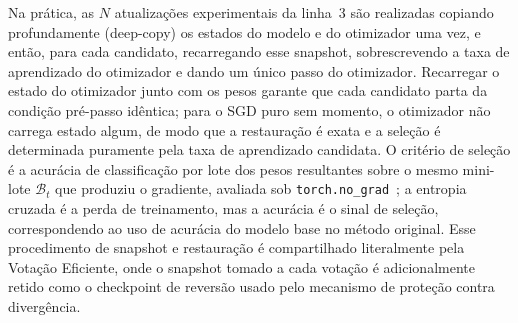 \documentclass[conference]{IEEEtran}
\begin{document}
Na prática, as $N$ atualizações experimentais da linha~3 são realizadas copiando profundamente (deep-copy) os estados do modelo e do otimizador uma vez, e então, para cada candidato, recarregando esse snapshot, sobrescrevendo a taxa de aprendizado do otimizador e dando um único passo do otimizador. Recarregar o estado do otimizador junto com os pesos garante que cada candidato parta da condição pré-passo idêntica; para o SGD puro sem momento, o otimizador não carrega estado algum, de modo que a restauração é exata e a seleção é determinada puramente pela taxa de aprendizado candidata. O critério de seleção é a acurácia de classificação por lote dos pesos resultantes sobre o mesmo mini-lote $\mathcal{B}_t$ que produziu o gradiente, avaliada sob \texttt{torch.no\_grad}~\cite{paszke2019pytorch}; a entropia cruzada é a perda de treinamento, mas a acurácia é o sinal de seleção, correspondendo ao uso de acurácia do modelo base no método original. Esse procedimento de snapshot e restauração é compartilhado literalmente pela Votação Eficiente, onde o snapshot tomado a cada votação é adicionalmente retido como o checkpoint de reversão usado pelo mecanismo de proteção contra divergência.
\end{document}

